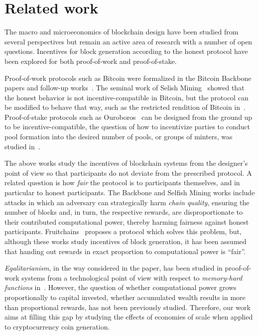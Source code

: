 \section{Related work}\label{sec:related}
The macro and microeconomics of blockchain design have been studied from
several perspectives but remain an active area of research with a number of open questions.
Incentives for block generation
according to the honest protocol have been explored for both proof-of-work and
proof-of-stake.

Proof-of-work protocols such as Bitcoin were formalized in the Bitcoin
Backbone~\cite{EC:GarKiaLeo15,C:GarKiaLeo17} papers and follow-up
works~\cite{pass2017analysis}. The seminal work of Selish
Mining~\cite{FC:EyaSir14,FC:SapSomZoh16} showed that the honest behavior is not
incentive-compatible in Bitcoin, but the protocol can be modified to behave
that way, such as the restricted rendition of Bitcoin
in~\cite{kiayias2016blockchain}.  Proof-of-stake protocols such as
Ouroboros~\cite{C:KRDO17} can be designed from the ground up to be
incentive-compatible, \eg the question of how to incentivize parties to conduct
pool formation into the desired number of pools, or groups of minters, was
studied in~\cite{bkks2018}.

The above works study the incentives of blockchain systems from the designer's
point of view so that participants do not deviate from the prescribed protocol.
A related question is how \emph{fair} the protocol is to participants
themselves, and in particular to honest participants. The Backbone and Selfish
Mining works include attacks in which an adversary can strategically harm
\emph{chain quality}, ensuring the number of blocks and, in turn, the respective
rewards, are disproportionate to their contributed computational power, thereby
harming fairness against honest participants. Fruitchains~\cite{PODC:PasShi17}
proposes a protocol which solves this problem, but, although
these works study incentives of block generation, it has been
assumed that handing out rewards in exact proportion to computational power is
``fair''.

\emph{Egalitarianism}, in the way considered in the paper, has been studied in
proof-of-work systems from a technological point of view with respect to
\emph{memory-hard functions} in~\cite{alwen2017depth,biryukov2016egalitarian}.  However, the question
of whether computational power grows proportionally to capital invested, \ie
whether accumulated wealth results in more than proportional rewards, has not
been previously studied. Therefore, our work aims at filling this gap by
studying the effects of economies of scale when applied to cryptocurrency coin
generation.


